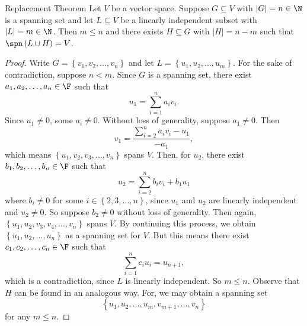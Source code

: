 \documentclass[linearalgebraI]{subfiles}
\begin{document}
    \begin{theorem}{Replacement Theorem}
        Let $V$ be a vector space. Suppose $G\subseteq V$ with $\left| G \right| = n\in\N$ is a spanning set and let $L\subseteq V$ be a linearly independent subset with $\left| L \right| = m\in\N$. Then $m\leq n$ and there exists $H\subseteq G$ with $\left| H \right| = n-m$ such that $\spn\left( L\cup H \right) = V$.
    \end{theorem}

    \begin{proof}
        Write $G = \left\lbrace v_1,v_2,\ldots,v_n \right\rbrace$ and let $L = \left\lbrace u_1,u_2,\ldots,u_m \right\rbrace$. For the sake of contradiction, suppose $n<m$. Since $G$ is a spanning set, there exist $a_1,a_2,\ldots,a_n\in\F$ such that
        \begin{equation*}
            u_1 = \sum^{n}_{i=1} a_iv_i.
        \end{equation*}
        Since $u_1\neq 0$, some $a_i\neq 0$. Without loss of generality, suppose $a_1\neq 0$. Then
        \begin{equation*}
            v_1 = \frac{\sum^{n}_{i=2} a_iv_i-u_1}{-a_1},
        \end{equation*}
        which means $\left\lbrace u_1,v_2,v_3,\ldots,v_n \right\rbrace$ spans $V$. Then, for $u_2$, there exist $b_1,b_2,\ldots,b_n\in\F$ such that
        \begin{equation*}
            u_2 = \sum^{n}_{i=2} b_iv_i + b_1u_1
        \end{equation*}
        where $b_i\neq 0$ for some $i\in\left\lbrace 2,3,\ldots,n \right\rbrace$, since $u_1$ and $u_2$ are linearly independent and $u_2\neq 0$. So suppose $b_2\neq 0$ without loss of generality. Then again, $\left\lbrace u_1,u_2,v_3,v_4,\ldots,v_n \right\rbrace$ spans $V$. By continuing this process, we obtain $\left\lbrace u_1,u_2,\ldots,u_n \right\rbrace$ as a spanning set for $V$. But this means there exist $c_1,c_2,\ldots,c_n\in\F$ such that
        \begin{equation*}
            \sum^{n}_{i=1} c_iu_i = u_{n+1},
        \end{equation*}
        which is a contradiction, since $L$ is linearly independent. So $m\leq n$. Observe that $H$ can be found in an analogous way. For, we may obtain a spanning set
        \begin{equation*}
            \left\lbrace u_1,u_2,\ldots,u_m,v_{m+1}, \ldots,v_n \right\rbrace 
        \end{equation*}
        for any $m\leq n$.
    \end{proof}
\end{document}
